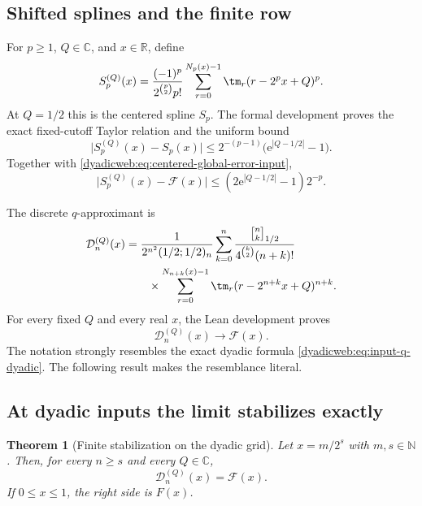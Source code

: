 \documentclass[11pt,oneside]{article}
\newtheorem{theorem}{Theorem}[section]
\theoremstyle{definition}
\theoremstyle{remark}
\newcommand{\R}{\mathbb R}
\newcommand{\C}{\mathbb C}
\newcommand{\N}{\mathbb N}
\newcommand{\e}{\mathrm e}
\newcommand{\qbinom}[3]{\genfrac{[}{]}{0pt}{}{#1}{#2}_{#3}}
\begin{document}
\subsection{Shifted splines and the finite row}

For $p\ge1$, $Q\in\C$, and $x\in\R$, define
\begin{equation}
 S_p^{(Q)}(x)=
 \frac{(-1)^p}{2^{\binom p2}p!}
 \sum_{r=0}^{N_p(x)-1}\tm_r(r-2^px+Q)^p.                  \label{dyadicweb:eq:shifted-spline-local}
\end{equation}
At $Q=1/2$ this is the centered spline $S_p$.  The formal development proves the exact
fixed-cutoff Taylor relation and the uniform bound
\begin{equation}
 \bigl|S_p^{(Q)}(x)-S_p(x)\bigr|
 \le2^{-(p-1)}\bigl(\e^{|Q-1/2|}-1\bigr).                 \label{dyadicweb:eq:shifted-spline-bound-local}
\end{equation}
Together with \eqref{dyadicweb:eq:centered-global-error-input},
\begin{equation}
 \bigl|S_p^{(Q)}(x)-\mathcal F(x)\bigr|
 \le(2\e^{|Q-1/2|}-1)2^{-p}.                              \label{dyadicweb:eq:shifted-total-error}
\end{equation}

The discrete $q$-approximant is
\begin{align}
 \mathcal D_n^{(Q)}(x)
 &=\frac1{2^{n^2}(1/2;1/2)_n}
 \sum_{k=0}^{n}
 \frac{\qbinom nk{1/2}}{4^{\binom k2}(n+k)!}             \notag\\
 &\qquad\times
 \sum_{r=0}^{N_{n+k}(x)-1}\tm_r
       (r-2^{n+k}x+Q)^{n+k}.                              \label{dyadicweb:eq:DnQ-local}
\end{align}
For every fixed $Q$ and every real $x$, the Lean development proves
\begin{equation}
 \mathcal D_n^{(Q)}(x)\longrightarrow\mathcal F(x).       \label{dyadicweb:eq:DnQ-limit-local}
\end{equation}
The notation strongly resembles the exact dyadic formula
\eqref{dyadicweb:eq:input-q-dyadic}.  The following result makes the resemblance literal.

\subsection{At dyadic inputs the limit stabilizes exactly}

\begin{theorem}[Finite stabilization on the dyadic grid]
\label{dyadicweb:thm:dyadic-stabilization}
Let $x=m/2^s$ with $m,s\in\N$.  Then, for every $n\ge s$ and every $Q\in\C$,
\begin{equation}
 \boxed{\mathcal D_n^{(Q)}(x)=\mathcal F(x).}              \label{dyadicweb:eq:dyadic-stabilization}
\end{equation}
If $0\le x\le1$, the right side is $F(x)$.
\end{theorem}
\end{document}
